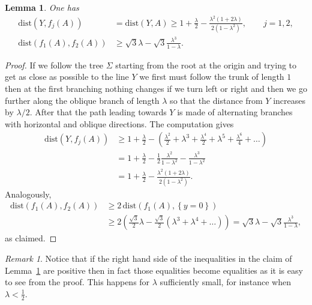 \documentclass{amsart}
\newcommand{\enclose}[1]{\left(#1\right)}
\newcommand{\ENCLOSE}[1]{\left\{#1\right\}}
\newcommand{\dist}{\mathrm{dist}}
\newtheorem{lemma}[theorem]{Lemma}
\theoremstyle{definition}
\theoremstyle{remark}
\newtheorem{remark}[theorem]{Remark}
\begin{document}
\begin{lemma}\label{lm:precedente1}
One has
\begin{align*}
    \dist(Y,f_j(A)) 
    &=\dist(Y,A)
    \ge
    1+ \frac{\lambda} 2 
    - \frac{\lambda^2(1+2\lambda)}{2(1-\lambda^2)},
    \qquad j=1,2,
    \\
    \dist(f_1(A),f_2(A)) & 
    \ge 
    \sqrt 3 \lambda - \sqrt 3 \frac{\lambda^3}{1-\lambda}.
\end{align*}
\end{lemma}
\begin{proof}
If we follow the tree $\Sigma$ starting from the root 
at the origin and trying to get as close as possible 
to the line $Y$ we first must follow the trunk of length 
$1$ then at the first branching nothing changes if we
turn left or right and then we go further along 
the oblique branch of length $\lambda$ so that the distance 
from $Y$ increases by $\lambda /2$. 
After that the path leading towards $Y$ is made 
of alternating branches with horizontal and oblique directions.
The computation gives
  \begin{align*}
  \dist(Y,f_j(A)) &\ge 1+ \frac \lambda 2 
     - \enclose{\frac{\lambda^2}{2} 
      + \lambda^3 
      + \frac{\lambda^4 }{2}
      + \lambda^5
      + \frac{\lambda^6}{4} + \dots}\\
      &= 1 + \frac \lambda 2 
      - \frac{1}{2}\frac{\lambda^2}{1-\lambda^2}
      - \frac{\lambda^3}{1-\lambda^2}\\
      &= 1+ \frac{\lambda} 2 
      - \frac{\lambda^2(1+2\lambda)}{2(1-\lambda^2)}.
  \end{align*}
  Analogously,  
  \begin{align*}
    \dist(f_1(A),f_2(A))
    &\ge 2\, \dist(f_1(A),\ENCLOSE{y=0}) \\
    &\ge 2\enclose{\frac{\sqrt 3}{2} \lambda 
      -\frac{\sqrt 3}{2}\enclose{\lambda^3 + \lambda^4 + \dots}
     }
    = \sqrt 3 \lambda -\sqrt 3 \frac{\lambda^3}{1-\lambda},
  \end{align*}
  as claimed.
\end{proof}

\begin{remark}
  Notice that if the right hand side of the inequalities 
  in the claim of Lemma~\ref{lm:precedente1}
  are positive then in fact those equalities 
  become equalities as it is easy to see from the proof.
  This happens for $\lambda$ sufficiently small, 
  for instance when $\lambda < \frac 1 2$.
\end{remark}
\end{document}
